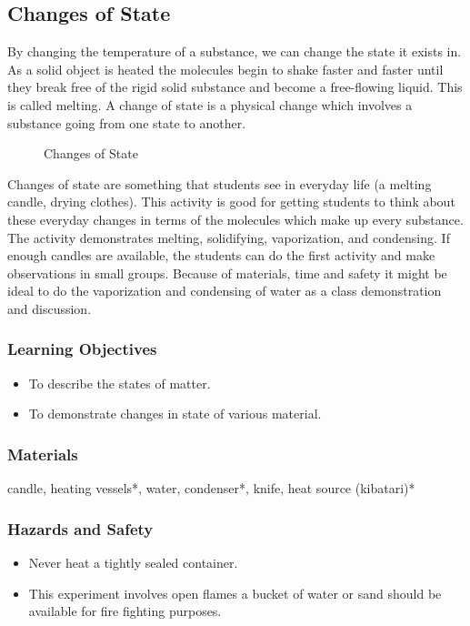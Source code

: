 \subsection{Changes of State}
By changing the temperature of a substance, we can change the state it exists in. As a solid object is heated the molecules begin to shake faster and faster until they break free of the rigid solid substance and become a free-flowing liquid. This is called melting. A change of state is a physical change which involves a substance going from one state to another.

\begin{figure}[h]
\begin{center}
\def\svgwidth{250pt}

\caption{Changes of State}
\end{center}
\end{figure}

Changes of state are something that students see in everyday life (a melting candle, drying clothes). This activity is good for getting students to think about these everyday changes in terms of the molecules which make up every substance. The activity demonstrates melting, solidifying, vaporization, and condensing. If enough candles are available, the students can do the first activity and make observations in small groups. Because of materials, time and safety it might be ideal to do the vaporization and condensing of water as a class demonstration and discussion.

\subsubsection*{Learning Objectives}
\begin{itemize}
\item{To describe the states of matter.}
\item{To demonstrate changes in state of various material.}
\end{itemize}

\subsubsection*{Materials}
candle, heating vessels*, water, condenser*, knife, heat source (kibatari)*

\subsubsection*{Hazards and Safety}
\begin{itemize}
\item{Never heat a tightly sealed container.}
\item{This experiment involves open flames a bucket of water or sand should be available for fire fighting purposes.}
\end{itemize}


